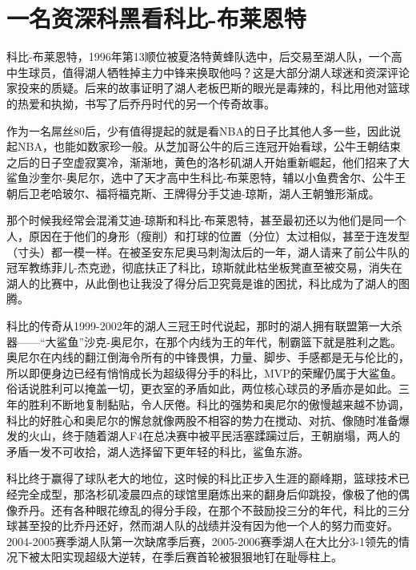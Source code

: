 \documentclass[
]{book}
\begin{document}
\hypertarget{ux4e00ux540dux8d44ux6df1ux79d1ux9ed1ux770bux79d1ux6bd4-ux5e03ux83b1ux6069ux7279}{%
\section{一名资深科黑看科比-布莱恩特}\label{ux4e00ux540dux8d44ux6df1ux79d1ux9ed1ux770bux79d1ux6bd4-ux5e03ux83b1ux6069ux7279}}

科比-布莱恩特，1996年第13顺位被夏洛特黄蜂队选中，后交易至湖人队，一个高中生球员，值得湖人牺牲掉主力中锋来换取他吗？这是大部分湖人球迷和资深评论家投来的质疑。后来的故事证明了湖人老板巴斯的眼光是毒辣的，科比用他对篮球的热爱和执拗，书写了后乔丹时代的另一个传奇故事。

作为一名屌丝80后，少有值得提起的就是看NBA的日子比其他人多一些，因此说起NBA，也能如数家珍一般。从芝加哥公牛的后三连冠开始看球，公牛王朝结束之后的日子空虚寂寞冷，渐渐地，黄色的洛杉矶湖人开始重新崛起，他们招来了大鲨鱼沙奎尔-奥尼尔，选中了天才高中生科比-布莱恩特，辅以小鱼费舍尔、公牛王朝后卫老哈玻尔、福将福克斯、王牌得分手艾迪-琼斯，湖人王朝雏形渐成。

那个时候我经常会混淆艾迪-琼斯和科比-布莱恩特，甚至最初还以为他们是同一个人，原因在于他们的身形（瘦削）和打球的位置（分位）太过相似，甚至于连发型（寸头）都一模一样。在被圣安东尼奥马刺淘汰后的一年，湖人请来了前公牛队的冠军教练菲儿-杰克逊，彻底扶正了科比，琼斯就此枯坐板凳直至被交易，消失在湖人的比赛中，从此倒也让我没了得分后卫究竟是谁的困扰，科比成为了湖人的图腾。

科比的传奇从1999-2002年的湖人三冠王时代说起，那时的湖人拥有联盟第一大杀器------``大鲨鱼''沙克-奥尼尔，在那个内线为王的年代，制霸篮下就是胜利之匙。奥尼尔在内线的翻江倒海令所有的中锋畏惧，力量、脚步、手感都是无与伦比的，所以即便身边已经有悄悄成长为超级得分手的科比，MVP的荣耀仍属于大鲨鱼。俗话说胜利可以掩盖一切，更衣室的矛盾如此，两位核心球员的矛盾亦是如此。三年的胜利不断地复制黏贴，令人厌倦。科比的强势和奥尼尔的傲慢越来越不协调，科比的好胜心和奥尼尔的懈怠就像两股不相容的势力在搅动、对抗、像随时准备爆发的火山，终于随着湖人F4在总决赛中被平民活塞蹂躏过后，王朝崩塌，两人的矛盾一发不可收拾，湖人选择留下更年轻的科比，鲨鱼东游。

科比终于赢得了球队老大的地位，这时候的科比正步入生涯的巅峰期，篮球技术已经完全成型，那洛杉矶凌晨四点的球馆里磨炼出来的翻身后仰跳投，像极了他的偶像乔丹。还有各种眼花缭乱的得分手段，在那个不鼓励投三分的年代，科比的三分球甚至投的比乔丹还好，然而湖人队的战绩并没有因为他一个人的努力而变好。2004-2005赛季湖人队第一次缺席季后赛，2005-2006赛季湖人在大比分3-1领先的情况下被太阳实现超级大逆转，在季后赛首轮被狠狠地钉在耻辱柱上。
\end{document}
